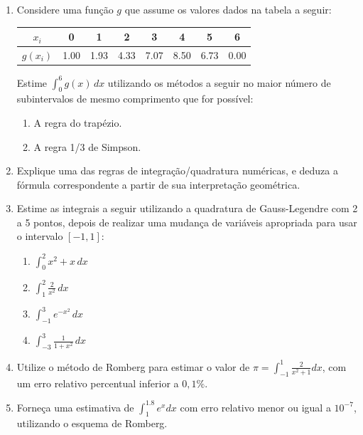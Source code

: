 \documentclass[12pt,a4paper]{article}
\begin{document}
\begin{enumerate}
\item Considere uma função $g$ que assume os valores dados na tabela a seguir:
\begin{center}
\begin{tabular}{|c|c|c|c|c|c|c|c|}
\hline
   $x_i$ & 0 & 1 & 2 & 3 & 4 & 5 & 6 \\ \hline
$g(x_i)$ & 1.00 & 1.93 & 4.33 & 7.07 & 8.50 & 6.73 & 0.00 \\ \hline
\end{tabular}
\end{center}
Estime $\int_0^6 g(x)\,dx$ utilizando os métodos a seguir no maior número de subintervalos de mesmo comprimento que for possível:
\begin{multicols}{2}
\begin{enumerate}
\item A regra do trapézio.
\item A regra 1/3 de Simpson.
\end{enumerate}
\end{multicols}

\item Explique uma das regras de integração/quadratura numéricas, e deduza a fórmula correspondente a partir de sua interpretação geométrica.

\item Estime as integrais a seguir utilizando a quadratura de Gauss-Legendre com 2 a 5 pontos, depois de realizar uma mudança de variáveis apropriada para usar o intervalo $[-1,1]$:
\begin{multicols}{4}
\begin{enumerate}
\item $\int_0^2 x^2 + x\,dx$
\item $\int_1^2 \frac{2}{x^2}\,dx$
\item $\int_{-1}^3 e^{-x^2}\,dx$
\item $\int_{-3}^3 \frac{1}{1+x^2} \,dx$
\end{enumerate}
\end{multicols}

\item Utilize o método de Romberg para estimar o valor de $\pi = \int_{-1}^1 \frac{2}{x^2 + 1} dx$, com um erro relativo percentual inferior a $0,1\%$.

\item Forneça uma estimativa de $\int_1^{1.8} e^x dx$ com erro relativo menor ou igual a $10^{-7}$, utilizando o esquema de Romberg.


\end{enumerate}
\end{document}
